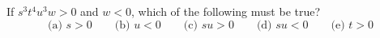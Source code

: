 If $s^3t^4u^3w>0$ and $w<0$, which of the following must be true?
\[
\text{(a) } s>0\qquad\text{(b) } u<0\qquad\text{(c) } su>0\qquad\text{(d) } su<0\qquad\text{(e) } t>0
\]
